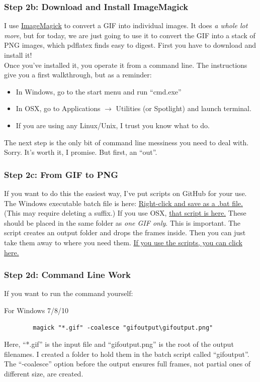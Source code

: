 \documentclass{beamer}
\begin{document}
\begin{frame}
	\frametitle{Step 2b: Download and Install ImageMagick}
	I use \href{https://www.imagemagick.org/script/binary-releases.php}{ImageMagick} to convert a GIF into individual images. It does \emph{a whole lot more}, but for today, we are just going to use it to convert the GIF into a stack of PNG images, which pdflatex finds easy to digest. First you have to download and install it! \\
	Once you've installed it, you operate it from a command line. The instructions give you a first walkthrough, but as a reminder:
		\begin{itemize}
			\item In Windows, go to the start menu and run ``cmd.exe''
			\item In OSX, go to Applications $\rightarrow$ Utilities (or Spotlight) and launch terminal.
			\item If you are using any Linux/Unix, I trust you know what to do.
		\end{itemize}
	The next step is the only bit of command line messiness you need to deal with. Sorry. It's worth it, I promise. But first, an ``out''.
\end{frame}

\begin{frame}
	\frametitle{Step 2c: From GIF to PNG}
	If you want to do this the easiest way, I've put scripts on GitHub for your use. The Windows executable batch file is here: \href{https://raw.githubusercontent.com/abhworthington/gifsinbeamer/master/ImageMagickscripts/giftopng.bat}{Right-click and save as a .bat file.} (This may require deleting a suffix.) If you use OSX, \href{}{that script is here.}
	These should be placed in the same folder as \emph{one GIF only}. This is important. The script creates an output folder and drops the frames inside. Then you can just take them away to where you need them. \hyperlink{STEP3a}{If you use the scripts, you can click here.}
\end{frame}

\begin{frame}[fragile]
	\frametitle{Step 2d: Command Line Work}
	If you want to run the command yourself:
		\begin{block}{For Windows 7/8/10}
		\begin{verbatim}
		magick "*.gif" -coalesce "gifoutput\gifoutput.png"
		\end{verbatim}
		Here, ``*.gif'' is the input file and ``gifoutput.png'' is the root of the output filenames. I created a folder to hold them in the batch script called ``gifoutput''. The ``-coalesce'' option before the output ensures full frames, not partial ones of different size, are created.
		\end{block}
\end{frame}
\end{document}
